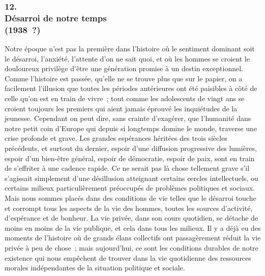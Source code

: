 \documentclass[french,twoside]{book} %
\begin{document}
\subsubsection[12. Désarroi de notre temps, (1938 ?)]{12. \\
Désarroi de notre temps \\
(1938 ?)}
\noindent \par
Notre époque n'est pas la première dans l'histoire où le sentiment dominant soit le désarroi, l'anxiété, l'attente d'on ne sait quoi, et où les hommes se croient le douloureux privilège d'être une génération promise à un destin exceptionnel. Comme l'histoire est passée, qu'elle ne se trouve plus que sur le papier, on a facilement l'illusion que toutes les périodes antérieures ont été paisibles à côté de celle qu'on est en train de vivre ; tout comme les adoles­cents de vingt ans se croient toujours les premiers qui aient jamais éprouvé les inquiétudes de la jeunesse. Cependant on peut dire, sans crainte d'exagérer, que l'humanité dans notre petit coin d'Europe qui depuis si longtemps domine le monde, traverse une crise profonde et grave. Les grandes espérances héri­tées des trois siècles précédents, et surtout du dernier, espoir d'une diffusion progressive des lumières, espoir d'un bien-être général, espoir de démocratie, espoir de paix, sont en train de s'effriter à une cadence rapide. Ce ne serait pas là chose tellement grave s'il s'agissait simplement d'une désillusion atteignant certains cercles intellectuels, ou certains milieux particulièrement préoccupés de problèmes politiques et sociaux. Mais nous sommes placés dans des conditions de vie telles que le désarroi touche et corrompt tous les aspects de la vie des hommes, toutes les sources d'activité, d'espérance et de bonheur. La vie privée, dans son cours quotidien, se détache de moins en moins de la vie publique, et cela dans tous les milieux. Il y a déjà eu des moments de l'histoire où de grands élans collectifs ont passagèrement réduit la vie privée à peu de chose ; mais aujourd'hui, ce sont les conditions durables de notre existence qui nous empêchent de trouver dans la vie quotidienne des ressources morales indépendantes de la situation politique et sociale.\par
\end{document}
